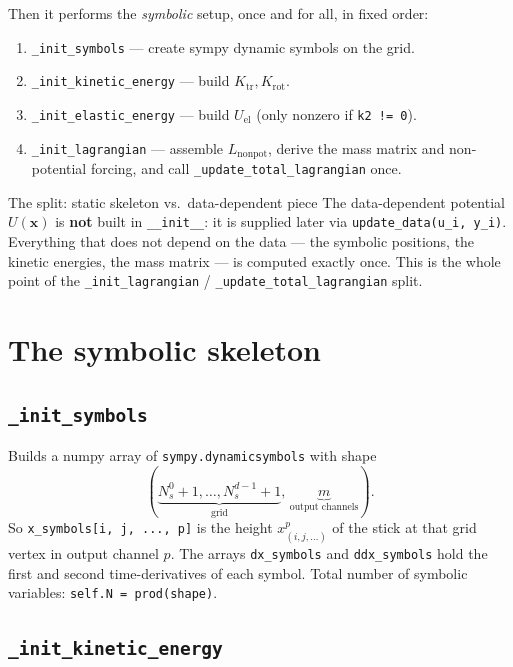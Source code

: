 \documentclass[11pt]{article}
\newcommand{\xv}{\mathbf{x}}
\newcommand{\code}[1]{\texttt{\small #1}}
\begin{document}
\medskip
Then it performs the \emph{symbolic} setup, once and for all, in fixed order:

\begin{enumerate}[leftmargin=*,itemsep=0pt]
  \item \code{\_init\_symbols} --- create sympy dynamic symbols on the grid.
  \item \code{\_init\_kinetic\_energy} --- build $K_\text{tr}, K_\text{rot}$.
  \item \code{\_init\_elastic\_energy} --- build $U_\text{el}$ (only nonzero if \code{k2 != 0}).
  \item \code{\_init\_lagrangian} --- assemble $L_\text{nonpot}$, derive the mass matrix and non-potential forcing, and call \code{\_update\_total\_lagrangian} once.
\end{enumerate}

\begin{ideabox}{The split: static skeleton vs.\ data-dependent piece}
The data-dependent potential $U(\xv)$ is \textbf{not} built in \code{\_\_init\_\_}: it is supplied later via \code{update\_data(u\_i, y\_i)}. Everything that does not depend on the data --- the symbolic positions, the kinetic energies, the mass matrix --- is computed exactly once. This is the whole point of the \code{\_init\_lagrangian} / \code{\_update\_total\_lagrangian} split.
\end{ideabox}

\section{The symbolic skeleton}

\subsection*{\texttt{\_init\_symbols}}

Builds a numpy array of \code{sympy.dynamicsymbols} with shape
\[
(\underbrace{N_s^0+1, \dots, N_s^{d-1}+1}_{\text{grid}},\, \underbrace{m}_{\text{output channels}}).
\]
So \code{x\_symbols[i, j, ..., p]} is the height $x_{(i,j,\dots)}^p$ of the stick at that grid vertex in output channel $p$. The arrays \code{dx\_symbols} and \code{ddx\_symbols} hold the first and second time-derivatives of each symbol. Total number of symbolic variables: \code{self.N = prod(shape)}.

\subsection*{\texttt{\_init\_kinetic\_energy}}
\end{document}
